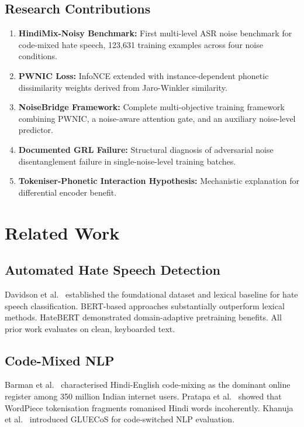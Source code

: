\documentclass[12pt,a4paper]{report}
\begin{document}
\section{Research Contributions}
\begin{enumerate}[leftmargin=*, label=\textbf{\arabic*.}]
  \item \textbf{HindiMix-Noisy Benchmark:} First multi-level ASR noise benchmark for code-mixed hate speech, 123,631 training examples across four noise conditions.
  \item \textbf{PWNIC Loss:} InfoNCE extended with instance-dependent phonetic dissimilarity weights derived from Jaro-Winkler similarity.
  \item \textbf{NoiseBridge Framework:} Complete multi-objective training framework combining PWNIC, a noise-aware attention gate, and an auxiliary noise-level predictor.
  \item \textbf{Documented GRL Failure:} Structural diagnosis of adversarial noise disentanglement failure in single-noise-level training batches.
  \item \textbf{Tokeniser-Phonetic Interaction Hypothesis:} Mechanistic explanation for differential encoder benefit.
\end{enumerate}

\chapter{Related Work}

\section{Automated Hate Speech Detection}
Davidson et al.\ \cite{davidson2017automated} established the foundational dataset and lexical baseline for hate speech classification. BERT-based approaches \cite{devlin2019bert, mozafari2020bert} substantially outperform lexical methods. HateBERT \cite{caselli2020hatebert} demonstrated domain-adaptive pretraining benefits. All prior work evaluates on clean, keyboarded text.

\section{Code-Mixed NLP}
Barman et al.\ \cite{barman2014code} characterised Hindi-English code-mixing as the dominant online register among 350 million Indian internet users. Pratapa et al.\ \cite{pratapa2018language} showed that WordPiece tokenisation fragments romanised Hindi words incoherently. Khanuja et al.\ \cite{khanuja2020gluecos} introduced GLUECoS for code-switched NLP evaluation.
\end{document}
